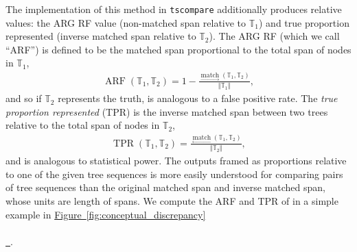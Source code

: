 \documentclass[10pt,twoside,lineno]{gsajnl}
\newcommand{\T}{\mathbb{T}}
\newcommand{\tscompare}{\texttt{tscompare}}
\newcommand{\match}{\underset{\longrightarrow}{\operatorname{match}}}
\newcommand{\invmatch}{\underset{\longleftarrow}{\operatorname{match}}}
\newcommand*{\figref}[2][]{%
	\hyperref[{#2}]{%
		Figure~\ref*{#2}%
		\ifx\\#1\\%
		\else
		\,#1%
		\fi
	}%
}
\begin{document}
The implementation of this method in \tscompare{}
additionally produces relative values:
the ARG RF value (non-matched span relative to $\T_1$)
and true proportion represented (inverse matched span relative to $\T_2$).
The ARG RF (which we call ``ARF'') is defined to be the matched span proportional
 to the total span of nodes in $\T_1$,
 \begin{align}\label{eqn:dissimilarity}
 	\operatorname{ARF}(\T_1,\T_2)
 	=1-\frac{\match(\T_1,\T_2)}{\Vert \T_1\Vert} ,
\end{align}
and so if $\T_2$ represents the truth, is analogous to a false positive rate.
The \emph{true proportion represented} (TPR) is the inverse matched span between 
two trees relative to the total span of nodes in $\T_2$,
\begin{align}\label{eqn:true-proportion}
	\operatorname{TPR}(\T_1,\T_2) = \frac{\invmatch(\T_1,\T_2)}
	{\Vert \T_2\Vert} ,
\end{align}
and is analogous to statistical power.
The outputs framed as proportions relative to one of the given tree sequences is more easily understood
for comparing pairs of tree sequences than the original matched span and inverse matched span, whose units are length of spans.
We compute the ARF and TPR of in a simple example in \figref{fig:conceptual_discrepancy}.
\end{document}
